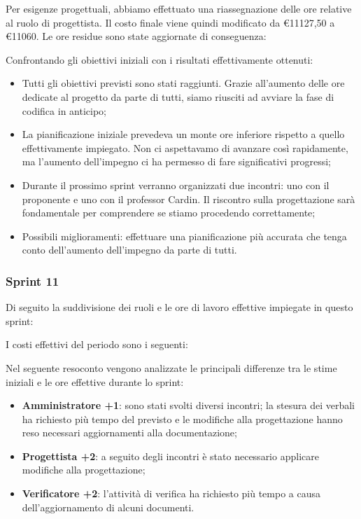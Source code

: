 Per esigenze progettuali, abbiamo effettuato una riassegnazione delle ore relative al ruolo di progettista. Il costo finale viene quindi modificato da \euro{11127,50} a \euro{11060}. Le ore residue sono state aggiornate di conseguenza:



Confrontando gli obiettivi iniziali con i risultati effettivamente ottenuti:
\begin{itemize}
    \item Tutti gli obiettivi previsti sono stati raggiunti. Grazie all’aumento delle ore dedicate al progetto da parte di tutti, siamo riusciti ad avviare la fase di codifica in anticipo;
    \item La pianificazione iniziale prevedeva un monte ore inferiore rispetto a quello effettivamente impiegato. Non ci aspettavamo di avanzare così rapidamente, ma l’aumento dell’impegno ci ha permesso di fare significativi progressi;
    \item Durante il prossimo sprint verranno organizzati due incontri: uno con il proponente e uno con il professor Cardin. Il riscontro sulla progettazione sarà fondamentale per comprendere se stiamo procedendo correttamente;
    \item Possibili miglioramenti: effettuare una pianificazione più accurata che tenga conto dell’aumento dell’impegno da parte di tutti.
\end{itemize}


\pagebreak

\subsubsection{Sprint 11}

Di seguito la suddivisione dei ruoli e le ore di lavoro effettive impiegate in questo sprint:



I costi effettivi del periodo sono i seguenti:



Nel seguente resoconto vengono analizzate le principali differenze tra le stime iniziali e le ore effettive durante lo sprint:
\begin{itemize}
    \item \textbf{Amministratore +1}: sono stati svolti diversi incontri; la stesura dei verbali ha richiesto più tempo del previsto e le modifiche alla progettazione hanno reso necessari aggiornamenti alla documentazione;
    \item \textbf{Progettista +2}: a seguito degli incontri è stato necessario applicare modifiche alla progettazione;
    \item \textbf{Verificatore +2}: l'attività di verifica ha richiesto più tempo a causa dell'aggiornamento di alcuni documenti.
\end{itemize}


